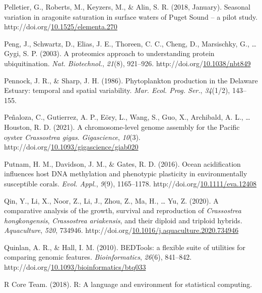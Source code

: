 \documentclass [11pt, proquest] {uwthesis}[2015/03/03]
\newlength{\cslhangindent}
\newenvironment{CSLReferences}%
{\setlength{\parindent}{0pt}%
\everypar{\setlength{\hangindent}{\cslhangindent}}\ignorespaces}%
{\par}
\begin{document}
\begin{CSLReferences}{1}{0}
\leavevmode\hypertarget{ref-Pelletier2018}{}%
Pelletier, G., Roberts, M., Keyzers, M., \& Alin, S. R. (2018, January). {Seasonal variation in aragonite saturation in surface waters of Puget Sound -- a pilot study}. http://doi.org/\href{https://doi.org/10.1525/elementa.270}{10.1525/elementa.270}

\leavevmode\hypertarget{ref-Peng2003}{}%
Peng, J., Schwartz, D., Elias, J. E., Thoreen, C. C., Cheng, D., Marsischky, G., \ldots{} Gygi, S. P. (2003). {A proteomics approach to understanding protein ubiquitination}. \emph{Nat. Biotechnol.}, \emph{21}(8), 921--926. http://doi.org/\href{https://doi.org/10.1038/nbt849}{10.1038/nbt849}

\leavevmode\hypertarget{ref-Pennock1986}{}%
Pennock, J. R., \& Sharp, J. H. (1986). {Phytoplankton production in the Delaware Estuary: temporal and spatial variability}. \emph{Mar. Ecol. Prog. Ser.}, \emph{34}(1/2), 143--155.

\leavevmode\hypertarget{ref-Penaloza2021}{}%
Peñaloza, C., Gutierrez, A. P., Eöry, L., Wang, S., Guo, X., Archibald, A. L., \ldots{} Houston, R. D. (2021). {A chromosome-level genome assembly for the Pacific oyster \emph{Crassostrea gigas}}. \emph{Gigascience}, \emph{10}(3). http://doi.org/\href{https://doi.org/10.1093/gigascience/giab020}{10.1093/gigascience/giab020}

\leavevmode\hypertarget{ref-Putnam2016}{}%
Putnam, H. M., Davidson, J. M., \& Gates, R. D. (2016). {Ocean acidification influences host DNA methylation and phenotypic plasticity in environmentally susceptible corals}. \emph{Evol. Appl.}, \emph{9}(9), 1165--1178. http://doi.org/\href{https://doi.org/10.1111/eva.12408}{10.1111/eva.12408}

\leavevmode\hypertarget{ref-Qin2020}{}%
Qin, Y., Li, X., Noor, Z., Li, J., Zhou, Z., Ma, H., \ldots{} Yu, Z. (2020). {A comparative analysis of the growth, survival and reproduction of \emph{Crassostrea hongkongensis}, \emph{Crassostrea ariakensis}, and their diploid and triploid hybrids}. \emph{Aquaculture}, \emph{520}, 734946. http://doi.org/\href{https://doi.org/10.1016/j.aquaculture.2020.734946}{10.1016/j.aquaculture.2020.734946}

\leavevmode\hypertarget{ref-Quinlan2010}{}%
Quinlan, A. R., \& Hall, I. M. (2010). {BEDTools: a flexible suite of utilities for comparing genomic features}. \emph{Bioinformatics}, \emph{26}(6), 841--842. http://doi.org/\href{https://doi.org/10.1093/bioinformatics/btq033}{10.1093/bioinformatics/btq033}

\leavevmode\hypertarget{ref-R_Core_Team2018}{}%
R Core Team. (2018). {R: A language and environment for statistical computing}.


\end{CSLReferences}
\end{document}
